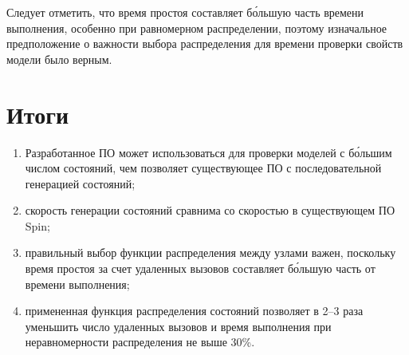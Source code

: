 \documentclass[12pt,a4paper,fleqn]{article}
\begin{document}
Следует отметить, что время простоя составляет б\'{о}льшую часть времени выполнения, особенно при
равномерном распределении, поэтому изначальное предположение о важности выбора распределения для
времени проверки свойств модели было верным.

\section{Итоги}

\begin{enumerate}
\item Разработанное ПО может использоваться для проверки моделей с б\'{о}льшим числом
  состояний, чем позволяет существующее ПО с последовательной генерацией состояний;
\item скорость генерации состояний сравнима со скоростью в существующем ПО Spin;
\item правильный выбор функции распределения между узлами важен, поскольку время простоя
  за счет удаленных вызовов составляет б\'{о}льшую часть от времени выполнения;
\item примененная функция распределения состояний позволяет в 2--3 раза уменьшить число
  удаленных вызовов и время выполнения при неравномерности распределения не выше 30\%.
\end{enumerate}
\end{document}
